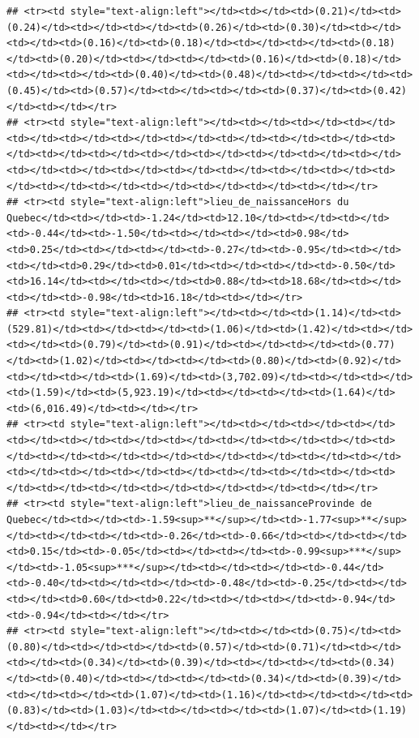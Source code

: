 \documentclass[
]{article}
\begin{document}
\begin{verbatim}
## <tr><td style="text-align:left"></td><td></td><td>(0.21)</td><td>(0.24)</td><td></td><td></td><td>(0.26)</td><td>(0.30)</td><td></td><td></td><td>(0.16)</td><td>(0.18)</td><td></td><td></td><td>(0.18)</td><td>(0.20)</td><td></td><td></td><td>(0.16)</td><td>(0.18)</td><td></td><td></td><td>(0.40)</td><td>(0.48)</td><td></td><td></td><td>(0.45)</td><td>(0.57)</td><td></td><td></td><td>(0.37)</td><td>(0.42)</td><td></td></tr>
## <tr><td style="text-align:left"></td><td></td><td></td><td></td><td></td><td></td><td></td><td></td><td></td><td></td><td></td><td></td><td></td><td></td><td></td><td></td><td></td><td></td><td></td><td></td><td></td><td></td><td></td><td></td><td></td><td></td><td></td><td></td><td></td><td></td><td></td><td></td><td></td></tr>
## <tr><td style="text-align:left">lieu_de_naissanceHors du Quebec</td><td></td><td>-1.24</td><td>12.10</td><td></td><td></td><td>-0.44</td><td>-1.50</td><td></td><td></td><td>0.98</td><td>0.25</td><td></td><td></td><td>-0.27</td><td>-0.95</td><td></td><td></td><td>0.29</td><td>0.01</td><td></td><td></td><td>-0.50</td><td>16.14</td><td></td><td></td><td>0.88</td><td>18.68</td><td></td><td></td><td>-0.98</td><td>16.18</td><td></td></tr>
## <tr><td style="text-align:left"></td><td></td><td>(1.14)</td><td>(529.81)</td><td></td><td></td><td>(1.06)</td><td>(1.42)</td><td></td><td></td><td>(0.79)</td><td>(0.91)</td><td></td><td></td><td>(0.77)</td><td>(1.02)</td><td></td><td></td><td>(0.80)</td><td>(0.92)</td><td></td><td></td><td>(1.69)</td><td>(3,702.09)</td><td></td><td></td><td>(1.59)</td><td>(5,923.19)</td><td></td><td></td><td>(1.64)</td><td>(6,016.49)</td><td></td></tr>
## <tr><td style="text-align:left"></td><td></td><td></td><td></td><td></td><td></td><td></td><td></td><td></td><td></td><td></td><td></td><td></td><td></td><td></td><td></td><td></td><td></td><td></td><td></td><td></td><td></td><td></td><td></td><td></td><td></td><td></td><td></td><td></td><td></td><td></td><td></td><td></td></tr>
## <tr><td style="text-align:left">lieu_de_naissanceProvinde de Quebec</td><td></td><td>-1.59<sup>**</sup></td><td>-1.77<sup>**</sup></td><td></td><td></td><td>-0.26</td><td>-0.66</td><td></td><td></td><td>0.15</td><td>-0.05</td><td></td><td></td><td>-0.99<sup>***</sup></td><td>-1.05<sup>***</sup></td><td></td><td></td><td>-0.44</td><td>-0.40</td><td></td><td></td><td>-0.48</td><td>-0.25</td><td></td><td></td><td>0.60</td><td>0.22</td><td></td><td></td><td>-0.94</td><td>-0.94</td><td></td></tr>
## <tr><td style="text-align:left"></td><td></td><td>(0.75)</td><td>(0.80)</td><td></td><td></td><td>(0.57)</td><td>(0.71)</td><td></td><td></td><td>(0.34)</td><td>(0.39)</td><td></td><td></td><td>(0.34)</td><td>(0.40)</td><td></td><td></td><td>(0.34)</td><td>(0.39)</td><td></td><td></td><td>(1.07)</td><td>(1.16)</td><td></td><td></td><td>(0.83)</td><td>(1.03)</td><td></td><td></td><td>(1.07)</td><td>(1.19)</td><td></td></tr>

\end{verbatim}
\end{document}
